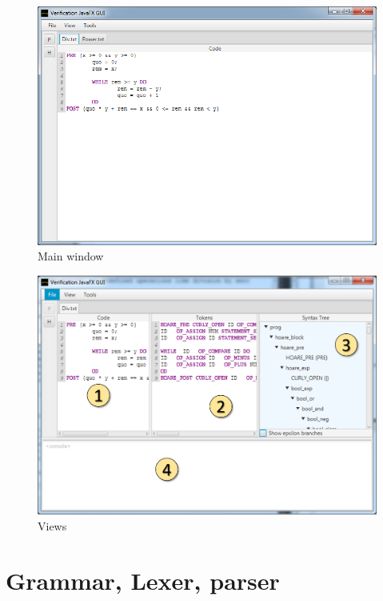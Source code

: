 \begin{figure}
	\centering
	
	\includegraphics[width=\textwidth]{images/gui_main.png}
	
	\caption{Main window}
	\label{fig:gui_main}
\end{figure}

\begin{figure}
	\centering
	
	\includegraphics[width=\textwidth]{images/gui_tokens_syntaxTree.png}
	
	\caption{Views}
	\label{fig:gui_views}
\end{figure}

\section{Grammar, Lexer, parser}

